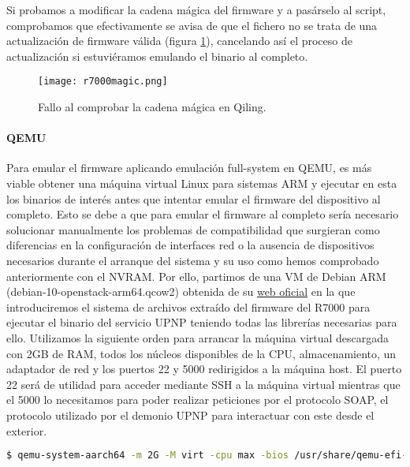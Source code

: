 Si probamos a modificar la cadena mágica del firmware y a pasárselo al script, comprobamos que efectivamente se avisa de que 
el fichero no se trata de una actualización de firmware válida (figura \ref{fig:R7000magic}), cancelando así el proceso de actualización si estuviéramos 
emulando el binario al completo.

\begin{figure}[H]
    \centering
    \texttt{[image: r7000magic.png]}
    \caption{Fallo al comprobar la cadena mágica en Qiling.}
    \label{fig:R7000magic}
\end{figure}

\paragraph{QEMU}
Para emular el firmware aplicando emulación full-system en QEMU, es más viable obtener una máquina virtual Linux para sistemas ARM 
y ejecutar en esta los binarios de interés antes que intentar emular el firmware del dispositivo al completo. Esto se debe a que para emular el firmware al completo sería necesario solucionar manualmente los problemas de compatibilidad que surgieran como diferencias en la configuración 
de interfaces red o la ausencia de dispositivos necesarios durante el arranque del sistema y su uso como hemos comprobado anteriormente 
con el NVRAM. Por ello, partimos de una VM de Debian ARM (debian-10-openstack-arm64.qcow2) obtenida de su  
\href{https://cdimage.debian.org/cdimage/cloud/OpenStack/}{web oficial} en la que introduciremos el sistema de archivos extraído del firmware 
del R7000 para ejecutar el binario del servicio UPNP teniendo todas las librerías necesarias para ello. Utilizamos la siguiente 
orden para arrancar la máquina virtual descargada con 2GB de RAM, todos los núcleos disponibles de la CPU, almacenamiento, un 
adaptador de red y los puertos 22 y 5000 redirigidos a la máquina host. El puerto 22 será de utilidad para acceder 
mediante SSH a la máquina virtual mientras que el 5000 lo necesitamos para poder realizar peticiones por el protocolo SOAP, el protocolo utilizado por el demonio UPNP para interactuar con este desde el exterior.

\begin{lstlisting}[language=bash, breaklines]
    $ qemu-system-aarch64 -m 2G -M virt -cpu max -bios /usr/share/qemu-efi-aarch64/QEMU_EFI.fd -drive if=none,file=debian-10-openstack-arm64.qcow2,id=hd0 -device virtio-blk-device,drive=hd0 -device e1000,netdev=net0 -netdev user,id=net0,hostfwd=tcp:127.0.0.1:1234-:22,hostfwd=tcp::5000-:5000 -nographic
\end{lstlisting}

